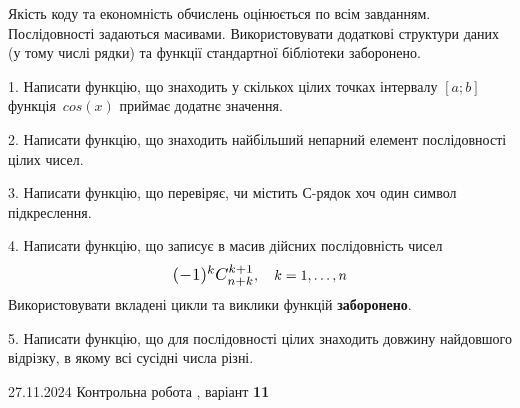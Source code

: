 \documentclass[12pt, ukrainian]{article}
\begin{document}
{{{{{{{{{%

{
Якість коду та економність обчислень оцінюється по всім завданням. Послідовності задаються масивами. Використовувати додаткові структури даних (у тому числі рядки) та функції стандартної бібліотеки заборонено.

\vspace{2mm}

\begin {large}
1. Написати функцію, що знаходить у скількох цілих точках інтервалу $[a; b]$ функція~$cos(x)$ приймає додатнє значення.

\vspace{2mm}


2. Написати функцію, що знаходить найбільший непарний елемент послідовності цілих чисел.

\vspace{2mm}


3. Написати функцію, що перевіряє, чи містить С-рядок хоч один символ підкреслення.

\vspace{2mm}


4. 
Написати функцію, що записує в масив дійсних послідовність чисел
$$\scalebox{1.2}{$(-1)^{k}C_{n+k}^{k+1}$}, \quad k=1,\ldots,n$$
Використовувати вкладені цикли та виклики функцій \textbf{заборонено}.

\vspace{2mm}


5. Написати функцію, що для послідовності цілих знаходить довжину найдовшого відрізку, в якому всі сусідні числа різні.

\vspace{2mm}

\end{large}
\newpage
{{27.11.2024 Контрольна робота , варіант  \No \textbf { 11 }\par}}


}}}}}}}}}}
\end{document}
